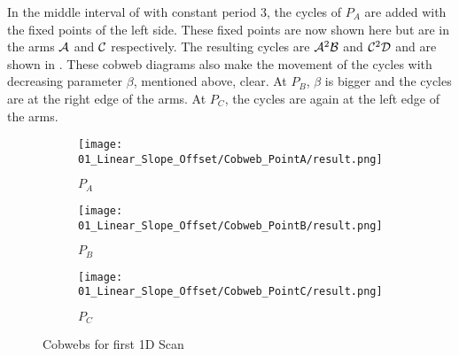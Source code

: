 In the middle interval of  with constant period 3, the cycles of $P_A$ are added with the fixed points of the left side.
These fixed points are now shown here but are in the arms $\mathcal{A}$ and $\mathcal{C}$ respectively.
The resulting cycles are $\mathcal{A}^2\mathcal{B}$ and $\mathcal{C}^2\mathcal{D}$ and are shown in .
These cobweb diagrams also make the movement of the cycles with decreasing parameter $\beta$, mentioned above, clear.
At $P_B$, $\beta$ is bigger and the cycles are at the right edge of the arms.
At $P_C$, the cycles are again at the left edge of the arms.

\begin{figure}
    \centering
    \begin{subfigure}{0.3\textwidth}
        \centering
        \texttt{[image: 01\_Linear\_Slope\_Offset/Cobweb\_PointA/result.png]}
        \caption{$P_A$}
        \label{fig:pcw.lin.CobwebA}
    \end{subfigure}
    \begin{subfigure}{0.3\textwidth}
        \centering
        \texttt{[image: 01\_Linear\_Slope\_Offset/Cobweb\_PointB/result.png]}
        \caption{$P_B$}
        \label{fig:pcw.lin.CobwebB}
    \end{subfigure}
    \begin{subfigure}{0.3\textwidth}
        \centering
        \texttt{[image: 01\_Linear\_Slope\_Offset/Cobweb\_PointC/result.png]}
        \caption{$P_C$}
        \label{fig:pcw.lin.CobwebC}
    \end{subfigure}
    \caption{Cobwebs for first 1D Scan}
    \label{fig:pcw.lin.CobwebA-C}
\end{figure}

